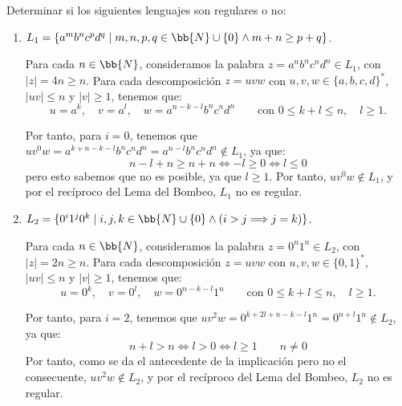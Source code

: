 \documentclass[12pt]{article}
\begin{document}
    \begin{ejercicio}
        Determinar si los siguientes lenguajes son regulares o no:
        \begin{enumerate}
            \item $L_1=\{a^m b^n c^p d^q\mid m,n,p,q\in \bb{N}\cup \{0\} \land m+n\geq p+q\}$.
            
            Para cada $n\in \bb{N}$, consideramos la palabra $z=a^nb^nc^nd^n\in L_1$, con $|z|=4n\geq n$.
            Para cada descomposición $z=uvw$ con $u,v,w\in \{a,b,c,d\}^*$, $|uv|\leq n$ y $|v|\geq 1$, tenemos que:
            \begin{equation*}
                u=a^k,\quad v=a^l,\quad w=a^{n-k-l}b^nc^nd^n\qquad \text{con }0\leq k+l\leq n,\quad l\geq 1.
            \end{equation*}

            Por tanto, para $i=0$, tenemos que $uv^0w=a^{k+n-k-l}b^nc^nd^n=a^{n-l}b^nc^nd^n\notin L_1$, ya que:
            \begin{equation*}
                n-l+n\geq n+n\Longleftrightarrow -l\geq 0
                \Longleftrightarrow l\leq 0
            \end{equation*}
            pero esto sabemos que no es posible, ya que $l\geq 1$. Por tanto, $uv^0w \notin L_1$, y por el recíproco del Lema del Bombeo, $L_1$ no es regular.
            \item $L_2=\{0^i 1^j 0^k \mid i,j,k\in \bb{N}\cup \{0\} \land \left(i>j\Longrightarrow j=k\right)\}$.
            
            Para cada $n\in \bb{N}$, consideramos la palabra $z=0^n1^n\in L_2$, con $|z|=2n\geq n$. Para cada descomposición $z=uvw$ con $u,v,w\in \{0,1\}^*$, $|uv|\leq n$ y $|v|\geq 1$, tenemos que:
            \begin{equation*}
                u=0^k,\quad v=0^l,\quad w=0^{n-k-l}1^n\qquad \text{con }0\leq k+l\leq n,\quad l\geq 1.
            \end{equation*}

            Por tanto, para $i=2$, tenemos que $uv^2w=0^{k+2l+n-k-l}1^n=0^{n+l}1^n\notin L_2$, ya que:
            \begin{equation*}
                n+l> n\Longleftrightarrow l> 0\Longleftrightarrow l\geq 1
                \qquad
                n\neq 0
            \end{equation*}
            Por tanto, como se da el antecedente de la implicación pero no el consecuente, $uv^2w \notin L_2$, y por el recíproco del Lema del Bombeo, $L_2$ no es regular.
        \end{enumerate}
    \end{ejercicio}
\end{document}
